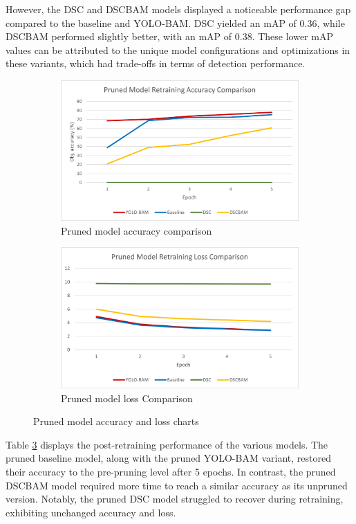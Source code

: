 However, the DSC and DSCBAM models displayed a noticeable performance gap compared to the baseline and YOLO-BAM. DSC yielded an mAP of 0.36, while DSCBAM performed slightly better, with an mAP of 0.38. These lower mAP values can be attributed to the unique model configurations and optimizations in these variants, which had trade-offs in terms of detection performance.

\begin{figure}[!htbp]
\centering
\begin{subfigure}{.5\textwidth}
  \centering
  \includegraphics[width=0.91\linewidth]{images/PruneAcc.png}
  \caption{Pruned model accuracy comparison}
  \label{fig:sub1}
\end{subfigure}%
\begin{subfigure}{.5\textwidth}
  \centering
  \includegraphics[width=0.95\linewidth]{images/PruneLoss.png}
  \caption{Pruned model loss Comparison}
  \label{fig:sub2}
\end{subfigure}
\caption{Pruned model accuracy and loss charts}
\label{fig:prunedresultchart}
\end{figure}

Table \ref{fig:prunedresultchart} displays the post-retraining performance of the various models. The pruned baseline model, along with the pruned YOLO-BAM variant, restored their accuracy to the pre-pruning level after 5 epochs. In contrast, the pruned DSCBAM model required more time to reach a similar accuracy as its unpruned version. Notably, the pruned DSC model struggled to recover during retraining, exhibiting unchanged accuracy and loss.

